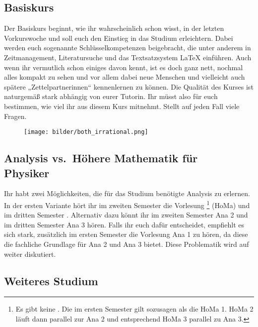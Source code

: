 \subsection{Basiskurs}
Der Basiskurs beginnt, wie ihr wahrscheinlich schon wisst, in der letzten Vorkurswoche und soll euch den Einstieg in das Studium erleichtern. Dabei werden euch sogenannte Schlüsselkompetenzen beigebracht, die unter anderem in Zeitmanagement, Literatursuche und das Textsatzsystem \LaTeX{} einführen. Auch wenn ihr vermutlich schon einiges davon kennt, ist es doch ganz nett, nochmal alles kompakt zu sehen und vor allem dabei neue Menschen und vielleicht auch spätere „Zettelpartnerinnen“ kennenlernen zu können. Die Qualität des Kurses ist naturgemäß stark abhängig von eurer Tutorin. Ihr müsst also für euch bestimmen, wie viel ihr aus diesem Kurs mitnehmt. Stellt auf jeden Fall viele Fragen.

\begin{figure}[b]
	\centering
	\texttt{[image: bilder/both\_irrational.png]}
\end{figure}


\subsection{Analysis vs.~Höhere Mathematik für \\Physiker}
Ihr habt zwei Möglichkeiten, die für das Studium benötigte Analysis zu erlernen.
In der ersten Variante hört ihr im zweiten Semester die Vorlesung \footnote{Es gibt keine . Die  im ersten Semester gilt sozusagen als die \gls{HoMa} 1. \gls{HoMa} 2 läuft dann parallel zur \gls{Ana} 2 und entsprechend \gls{HoMa} 3 parallel zu \gls{Ana} 3.} (\gls{HoMa}) und im dritten Semester . Alternativ dazu könnt ihr im zweiten Semester \gls{Ana} 2 und im dritten Semester \gls{Ana} 3 hören. Falls ihr euch dafür entscheidet, empfiehlt es sich stark, zusätzlich im ersten Semester die Vorlesung \gls{Ana} 1 zu hören, da diese die fachliche Grundlage für \gls{Ana} 2 und \gls{Ana} 3 bietet. Diese Problematik wird auf  weiter diskutiert.

\subsection{Weiteres Studium}

